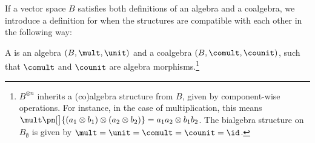 \documentclass{article}
\begin{document}
If a vector space $B$ satisfies both definitions of an algebra and a coalgebra,
we introduce a definition for when the structures are compatible with each other
in the following way:

\begin{definition}[bialgebra]
        A  is an algebra $(B,\mult,\unit)$ and a coalgebra
        $(B,\comult,\counit)$, such that $\comult$ and $\counit$ are algebra
        morphisms.\footnote{
                $B^{\otimes n}$ inherits a (co)algebra structure
                from $B$, given by
                component-wise operations. For instance, in the case of
                multiplication, this
                means $\mult\pn[\big]{(a_1\otimes b_1) \otimes (a_2 \otimes
                b_2)} = a_1a_2 \otimes b_1 b_2$. The bialgebra structure on
                $B_{\emptyset}$ is given by
                $\mult = \unit = \comult = \counit = \id$.
        }
\end{definition}

\end{document}
